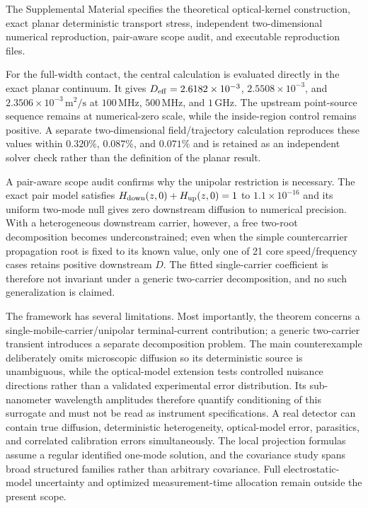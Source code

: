 \documentclass[aps,pra,twocolumn,superscriptaddress,nofootinbib]{revtex4-2}
\begin{document}
The Supplemental Material specifies the theoretical optical-kernel construction, exact planar deterministic transport stress, independent two-dimensional numerical reproduction, pair-aware scope audit, and executable reproduction files.

For the full-width contact, the central calculation is evaluated directly in the exact planar continuum. It gives $D_{\rm eff}=2.6182\times10^{-3}$, $2.5508\times10^{-3}$, and $2.3506\times10^{-3}\,\mathrm{m^2/s}$ at $100\,\mathrm{MHz}$, $500\,\mathrm{MHz}$, and $1\,\mathrm{GHz}$. The upstream point-source sequence remains at numerical-zero scale, while the inside-region control remains positive. A separate two-dimensional field/trajectory calculation reproduces these values within $0.320\%$, $0.087\%$, and $0.071\%$ and is retained as an independent solver check rather than the definition of the planar result.

A pair-aware scope audit confirms why the unipolar restriction is necessary. The exact pair model satisfies $H_{\rm down}(z,0)+H_{\rm up}(z,0)=1$ to $1.1\times10^{-16}$ and its uniform two-mode null gives zero downstream diffusion to numerical precision. With a heterogeneous downstream carrier, however, a free two-root decomposition becomes underconstrained; even when the simple countercarrier propagation root is fixed to its known value, only one of 21 core speed/frequency cases retains positive downstream $D$. The fitted single-carrier coefficient is therefore not invariant under a generic two-carrier decomposition, and no such generalization is claimed.

The framework has several limitations. Most importantly, the theorem concerns a single-mobile-carrier/unipolar terminal-current contribution; a generic two-carrier transient introduces a separate decomposition problem. The main counterexample deliberately omits microscopic diffusion so its deterministic source is unambiguous, while the optical-model extension tests controlled nuisance directions rather than a validated experimental error distribution. Its sub-nanometer wavelength amplitudes therefore quantify conditioning of this surrogate and must not be read as instrument specifications. A real detector can contain true diffusion, deterministic heterogeneity, optical-model error, parasitics, and correlated calibration errors simultaneously. The local projection formulas assume a regular identified one-mode solution, and the covariance study spans broad structured families rather than arbitrary covariance. Full electrostatic-model uncertainty and optimized measurement-time allocation remain outside the present scope.
\end{document}
